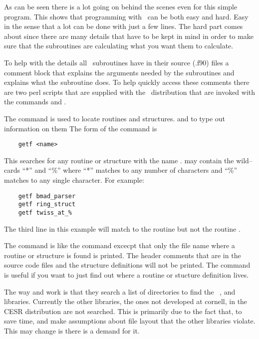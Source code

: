 As can be seen there is a lot going on behind the scenes even for this
simple program. This shows that programming with \bmad\ can be both easy
and hard. Easy in the sense that a lot can be done with just a few
lines. The hard part comes about since there are many details that
have to be kept in mind in order to make sure that the subroutines
are calculating what you want them to calculate.

To help with the details all \bmad\ subroutines have in their source (.f90)
files a comment block that explains the arguments needed by the
subroutines and explains what the subroutine does. To help quickly
access these comments there are two perl scripts that are supplied
with the \bmad\ distribution that are invoked with the commands
 and .

The  command is used to locate routines and structures.
and to type out information on them
The form of the command is
\begin{verbatim}
    getf <name>
\end{verbatim}
This searches for any routine or structure with the name
.  may contain the wild--cards ``*'' and ``\%'' where
``*'' matches to any number of characters and ``\%'' matches to any
single character. For example:
\begin{verbatim}
    getf bmad_parser
    getf ring_struct
    getf twiss_at_%
\end{verbatim}
The third line in this example will match to the routine  but not
the routine .

The  command is like the  command excecpt that only
the file name where a routine or structure is found is printed. The
header comments that are in the source code files and the structure
definitions will not be printed. The  command is useful if you
want to just find out where a routine or stucture definition lives.

The way  and  work is that they search a list of
directories to find the \bmad\, , and 
libraries. Currently the other libraries, the ones not developed at cornell,
in the CESR distribution are not searched. This is primarily due to 
the fact that, to save time,  and  make assumptions
about file layout that the other libraries violate. This may change is there
is a demand for it.

